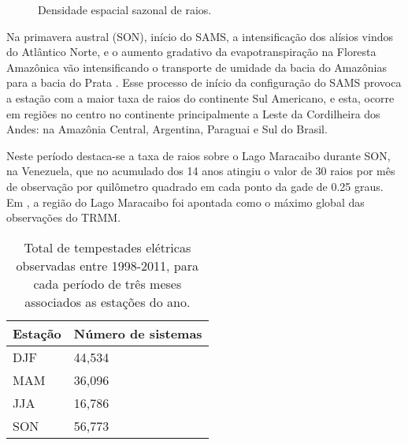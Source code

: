 \begin{figure}[!ht]
  \caption{Densidade espacial sazonal de raios.}
\label{TaxaFlash}
\end{figure} 


Na primavera austral (SON), início do SAMS, a intensificação dos alísios vindos do Atlântico Norte, e o aumento gradativo da evapotranspiração na Floresta Amazônica vão intensificando o transporte de umidade da bacia do Amazônias para a bacia do Prata \cite{marengo2004}.  Esse processo de início da configuração do SAMS provoca a estação com a maior taxa de raios do continente Sul Americano, e esta, ocorre em regiões no centro no continente principalmente a Leste da Cordilheira dos Andes: na Amazônia Central, Argentina, Paraguai e Sul do Brasil.


Neste período destaca-se a taxa de raios sobre o Lago Maracaibo durante SON, na Venezuela, que no acumulado dos 14 anos atingiu o valor de 30 raios por mês de observação por quilômetro quadrado em cada ponto da gade de 0.25 graus. Em , a região do Lago Maracaibo foi apontada como o máximo global das observações do TRMM. 


\begin{table}[!h]
\caption{Total de tempestades elétricas observadas entre 1998-2011, para cada período de três meses associados as estações do ano.}
\label{EstacaoQtd}
\centering
\small
\newcommand{\grayline}{\rowcolor[gray]{.88}}
\renewcommand {\tabularxcolumn }[1]{ >{\arraybackslash }m{#1}}
\begin{tabularx}{\textwidth}{W W} %
\hline \hline 
Estação & Número de sistemas \\[1.5pt]
 \hline
\grayline DJF & 44,534\\[1.5pt]
MAM & 36,096\\[1.5pt]
\grayline JJA & 16,786\\[1.5pt] 
SON & 56,773\\[1.5pt]
\hline 
\end{tabularx}
\end{table}

